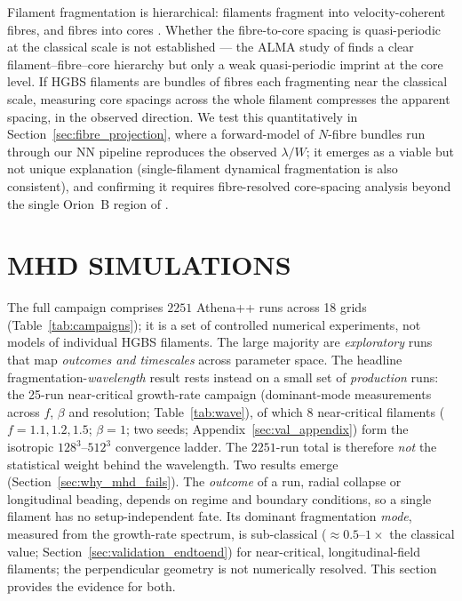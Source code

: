 \documentclass[usenatbib,twoside,twocolumn]{mnras}
\begin{document}
Filament fragmentation is hierarchical: filaments fragment into velocity-coherent fibres, and fibres into cores \citep{Hacar2013,Hacar2018,Yang2024}. Whether the fibre-to-core spacing is quasi-periodic at the classical scale is not established --- the ALMA study of \citet{Yang2024} finds a clear filament--fibre--core hierarchy but only a weak quasi-periodic imprint at the core level. If HGBS filaments are bundles of fibres each fragmenting near the classical scale, measuring core spacings across the whole filament compresses the apparent spacing, in the observed direction. We test this quantitatively in Section~\ref{sec:fibre_projection}, where a forward-model of $N$-fibre bundles run through our NN pipeline reproduces the observed $\lambda/W$; it emerges as a viable but not unique explanation (single-filament dynamical fragmentation is also consistent), and confirming it requires fibre-resolved core-spacing analysis beyond the single Orion~B region of \citet{Yang2024}.

\section{MHD SIMULATIONS}

The full campaign comprises $2251$ Athena++ runs across 18 grids (Table~\ref{tab:campaigns}); it is a set of controlled numerical experiments, not models of individual HGBS filaments. The large majority are \emph{exploratory} runs that map \emph{outcomes and timescales} across parameter space. The headline fragmentation-\emph{wavelength} result rests instead on a small set of \emph{production} runs: the 25-run near-critical growth-rate campaign (dominant-mode measurements across $f$, $\beta$ and resolution; Table~\ref{tab:wave}), of which 8 near-critical filaments ($f=1.1,1.2,1.5$; $\beta=1$; two seeds; Appendix~\ref{sec:val_appendix}) form the isotropic $128^3$--$512^3$ convergence ladder. The $2251$-run total is therefore \emph{not} the statistical weight behind the wavelength. Two results emerge (Section~\ref{sec:why_mhd_fails}). The \emph{outcome} of a run, radial collapse or longitudinal beading, depends on regime and boundary conditions, so a single filament has no setup-independent fate. Its dominant fragmentation \emph{mode}, measured from the growth-rate spectrum, is sub-classical ($\approx0.5$--$1\times$ the classical value; Section~\ref{sec:validation_endtoend}) for near-critical, longitudinal-field filaments; the perpendicular geometry is not numerically resolved. This section provides the evidence for both.
\end{document}
